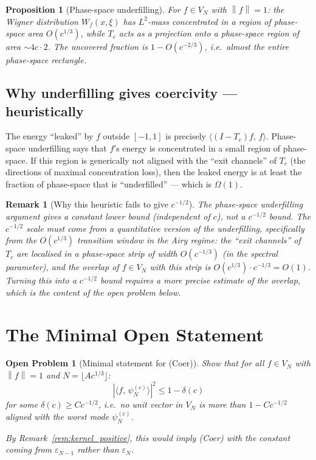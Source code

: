 \documentclass[12pt,a4paper]{article}
\newtheorem{proposition}[theorem]{Proposition}
\newtheorem{remark}[theorem]{Remark}
\newtheorem{openproblem}[theorem]{Open Problem}
\newcommand{\pswf}[1]{\psi_{#1}^{(c)}}
\newcommand{\Tc}{T_c}
\newcommand{\VN}{V_N}
\newcommand{\inner}[2]{\langle #1,\, #2 \rangle}
\newcommand{\norm}[1]{\left\|#1\right\|}
\begin{document}
\begin{proposition}[Phase-space underfilling]
\label{prop:phasespace}
For $f \in \VN$ with $\norm{f}=1$:
the Wigner distribution $W_f(x,\xi)$ has
$L^2$-mass concentrated in a region of
phase-space area $O(c^{1/3})$,
while $\Tc$ acts as a projection onto a
phase-space region of area $\sim 4c \cdot 2$.
The \emph{uncovered fraction} is
$1 - O(c^{-2/3})$, i.e.\ almost the entire
phase-space rectangle.
\end{proposition}

\subsection{Why underfilling gives coercivity --- heuristically}

The energy ``leaked'' by $f$ outside $[-1,1]$
is precisely $\inner{(I-\Tc)f}{f}$.
Phase-space underfilling says that $f$'s
energy is concentrated in a small region
of phase-space.
If this region is generically not aligned with the
``exit channels'' of $\Tc$ (the directions of
maximal concentration loss), then the leaked
energy is at least the fraction
of phase-space that is ``underfilled'' ---
which is $\Omega(1)$.

\begin{remark}[Why this heuristic fails to give $c^{-1/2}$]
The phase-space underfilling argument gives a
constant lower bound (independent of $c$),
not a $c^{-1/2}$ bound.
The $c^{-1/2}$ scale must come from a
\emph{quantitative} version of the underfilling,
specifically from the $O(c^{1/3})$ transition
window in the Airy regime:
the ``exit channels'' of $\Tc$ are localised
in a phase-space strip of width $O(c^{-1/3})$
(in the spectral parameter), and the overlap
of $f \in \VN$ with this strip is
$O(c^{1/3}) \cdot c^{-1/3} = O(1)$.
Turning this into a $c^{-1/2}$ bound
requires a more precise estimate of the
overlap, which is the content of the
open problem below.
\end{remark}

\section{The Minimal Open Statement}
\label{sec:open}

\begin{openproblem}[Minimal statement for (Coer)]
\label{op:minimal}
Show that for all $f \in \VN$
with $\norm{f} = 1$ and
$N = \lfloor Ac^{1/3} \rfloor$:
\[
  |\inner{f}{\pswf{N}}|^2
  \leq 1 - \delta(c)
\]
for some $\delta(c) \geq C c^{-1/2}$,
i.e.\ no unit vector in $\VN$
is more than $1 - Cc^{-1/2}$
aligned with the worst mode $\pswf{N}$.

\medskip\noindent
By Remark~\ref{rem:kernel_positive},
this would imply (Coer) with the constant
coming from $\varepsilon_{N-1}$ rather than $\varepsilon_N$.
\end{openproblem}
\end{document}
